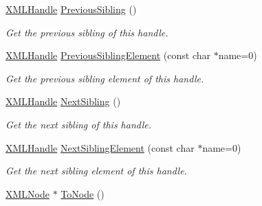 \begin{DoxyCompactItemize}
\mbox{\label{classtinyxml2_1_1XMLHandle_a428374e756f4db4cbc287fec64eae02c}} 
\mbox{\hyperlink{classtinyxml2_1_1XMLHandle}{X\+M\+L\+Handle}} \mbox{\hyperlink{classtinyxml2_1_1XMLHandle_a428374e756f4db4cbc287fec64eae02c}{Previous\+Sibling}} ()
\begin{DoxyCompactList}\small\item\em Get the previous sibling of this handle. \end{DoxyCompactList}\item 
\mbox{\label{classtinyxml2_1_1XMLHandle_a786957e498039554ed334cdc36612a7e}} 
\mbox{\hyperlink{classtinyxml2_1_1XMLHandle}{X\+M\+L\+Handle}} \mbox{\hyperlink{classtinyxml2_1_1XMLHandle_a786957e498039554ed334cdc36612a7e}{Previous\+Sibling\+Element}} (const char $\ast$name=0)
\begin{DoxyCompactList}\small\item\em Get the previous sibling element of this handle. \end{DoxyCompactList}\item 
\mbox{\label{classtinyxml2_1_1XMLHandle_aad2eccc7c7c7b18145877c978c3850b5}} 
\mbox{\hyperlink{classtinyxml2_1_1XMLHandle}{X\+M\+L\+Handle}} \mbox{\hyperlink{classtinyxml2_1_1XMLHandle_aad2eccc7c7c7b18145877c978c3850b5}{Next\+Sibling}} ()
\begin{DoxyCompactList}\small\item\em Get the next sibling of this handle. \end{DoxyCompactList}\item 
\mbox{\label{classtinyxml2_1_1XMLHandle_ae41d88ee061f3c49a081630ff753b2c5}} 
\mbox{\hyperlink{classtinyxml2_1_1XMLHandle}{X\+M\+L\+Handle}} \mbox{\hyperlink{classtinyxml2_1_1XMLHandle_ae41d88ee061f3c49a081630ff753b2c5}{Next\+Sibling\+Element}} (const char $\ast$name=0)
\begin{DoxyCompactList}\small\item\em Get the next sibling element of this handle. \end{DoxyCompactList}\item 
\mbox{\label{classtinyxml2_1_1XMLHandle_a03ea6ec970a021b71bf1219a0f6717df}} 
\mbox{\hyperlink{classtinyxml2_1_1XMLNode}{X\+M\+L\+Node}} $\ast$ \mbox{\hyperlink{classtinyxml2_1_1XMLHandle_a03ea6ec970a021b71bf1219a0f6717df}{To\+Node}} ()

\end{DoxyCompactItemize}
